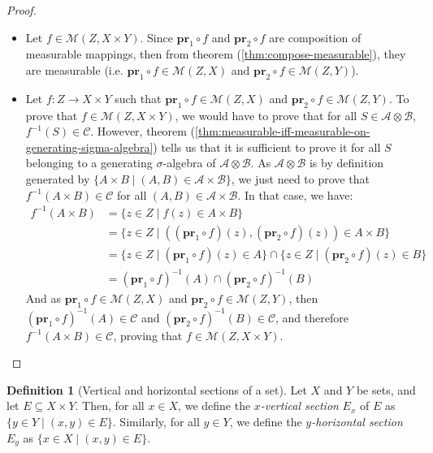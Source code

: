 \documentclass{article}
\theoremstyle{definition}
\newtheorem{definition}{Definition}[section]
\theoremstyle{remark}
\theoremstyle{example}
\theoremstyle{notation}
\theoremstyle{axiom}
\newcommand{\pr}{\mathbf{pr}}
\begin{document}
\begin{proof}~
		\begin{itemize}
				\item Let $f \in \mathcal{M}(Z, X \times Y)$. Since $\pr_1 \circ f$ and $\pr_2 \circ f$ are composition of measurable mappings, then from theorem (\ref{thm:compose-measurable}), they are measurable (i.e. $\pr_1 \circ f \in \mathcal{M}(Z, X)$ and $\pr_2 \circ f \in \mathcal{M}(Z, Y)$).
				\item Let $f : Z \rightarrow X \times Y$ such that $\pr_1 \circ f \in \mathcal{M}(Z, X)$ and $\pr_2 \circ f \in \mathcal{M}(Z, Y)$. To prove that $f \in \mathcal{M}(Z, X \times Y)$, we would have to prove that for all $S \in \mathcal{A} \otimes \mathcal{B}$, $f^{-1}(S) \in \mathcal{C}$. However, theorem (\ref{thm:measurable-iff-measurable-on-generating-sigma-algebra}) tells us that it is sufficient to prove it for all $S$ belonging to a generating $\sigma$-algebra of $\mathcal{A} \otimes \mathcal{B}$. As $\mathcal{A} \otimes \mathcal{B}$ is by definition generated by $\{A \times B \mid (A, B) \in \mathcal{A} \times \mathcal{B}\}$, we just need to prove that $f^{-1}(A \times B) \in \mathcal{C}$ for all $(A, B) \in \mathcal{A} \times \mathcal{B}$. In that case, we have:
				\begin{align*}
						f^{-1}(A \times B) &= \{z \in Z \mid f(z) \in A \times B\}\\
										   &= \{z \in Z \mid ((\pr_1 \circ f)(z), (\pr_2 \circ f)(z)) \in A \times B\}\\
										   &= \{z \in Z \mid (\pr_1 \circ f)(z) \in A\} \cap \{z \in Z \mid (\pr_2 \circ f)(z) \in B\}\\
										   &= (\pr_1 \circ f)^{-1}(A) \cap (\pr_2 \circ f)^{-1}(B)
				\end{align*}
						And as $\pr_1 \circ f \in \mathcal{M}(Z, X)$ and $\pr_2 \circ f \in \mathcal{M}(Z, Y)$, then $(\pr_1 \circ f)^{-1}(A) \in \mathcal{C}$ and $(\pr_2 \circ f)^{-1}(B) \in \mathcal{C}$, and therefore $f^{-1}(A \times B) \in \mathcal{C}$, proving that $f \in \mathcal{M}(Z, X \times Y)$.
		\end{itemize}
\end{proof}

\begin{definition}[Vertical and horizontal sections of a set]%
		Let $X$ and $Y$ be sets, and let $E \subseteq X \times Y$. Then, for all $x \in X$, we define the \textit{$x$-vertical section} $E_x$ of $E$ as $\{y \in Y \mid (x, y) \in E\}$. Similarly, for all $y \in Y$, we define the \textit{$y$-horizontal section} $E_y$ as $\{x \in X \mid (x, y) \in E\}$.
\end{definition}
\end{document}
